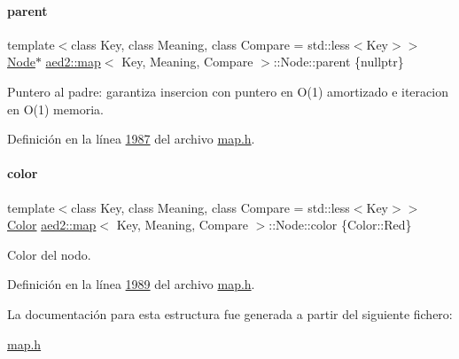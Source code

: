 \mbox{\label{structaed2_1_1map_1_1Node_ab6a5f9e471b311755e4a56834086cb90_ab6a5f9e471b311755e4a56834086cb90}} 
\paragraph{\texorpdfstring{parent}{parent}}
{\footnotesize\ttfamily template$<$class Key, class Meaning, class Compare = std\+::less$<$\+Key$>$$>$ \\
\hyperlink{structaed2_1_1map_1_1Node}{Node}$\ast$ \hyperlink{classaed2_1_1map}{aed2\+::map}$<$ Key, Meaning, Compare $>$\+::Node\+::parent \{nullptr\}}



Puntero al padre\+: garantiza insercion con puntero en O(1) amortizado e iteracion en O(1) memoria. 



Definición en la línea \hyperlink{map_8h_source_l01987}{1987} del archivo \hyperlink{map_8h_source}{map.\+h}.

\mbox{\label{structaed2_1_1map_1_1Node_a58dd9993fee8ee3eaa5716b72a3eca47_a58dd9993fee8ee3eaa5716b72a3eca47}} 
\paragraph{\texorpdfstring{color}{color}}
{\footnotesize\ttfamily template$<$class Key, class Meaning, class Compare = std\+::less$<$\+Key$>$$>$ \\
\hyperlink{classaed2_1_1map_a6d62a415a4b9d320b30cada4ebcf9f5b_a6d62a415a4b9d320b30cada4ebcf9f5b}{Color} \hyperlink{classaed2_1_1map}{aed2\+::map}$<$ Key, Meaning, Compare $>$\+::Node\+::color \{Color\+::\+Red\}}



Color del nodo. 



Definición en la línea \hyperlink{map_8h_source_l01989}{1989} del archivo \hyperlink{map_8h_source}{map.\+h}.



La documentación para esta estructura fue generada a partir del siguiente fichero\+:\begin{DoxyCompactItemize}
\item 
\hyperlink{map_8h}{map.\+h}\end{DoxyCompactItemize}
